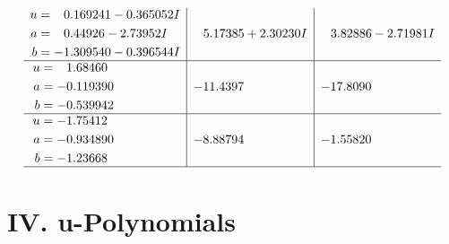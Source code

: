 \documentclass[1p]{elsarticle_modified}
\theoremstyle{definition}
\begin{document}
$$\begin{array}{c|c|c}
\begin{aligned}
u &= \phantom{-}0.169241 - 0.365052 I \\
a &= \phantom{-}0.44926 - 2.73952 I \\
b &= -1.309540 - 0.396544 I\end{aligned}
 & \phantom{-}5.17385 + 2.30230 I & \phantom{-}3.82886 - 2.71981 I \\ \hline\begin{aligned}
u &= \phantom{-}1.68460\phantom{ +0.000000I} \\
a &= -0.119390\phantom{ +0.000000I} \\
b &= -0.539942\phantom{ +0.000000I}\end{aligned}
 & -11.4397\phantom{ +0.000000I} & -17.8090\phantom{ +0.000000I} \\ \hline\begin{aligned}
u &= -1.75412\phantom{ +0.000000I} \\
a &= -0.934890\phantom{ +0.000000I} \\
b &= -1.23668\phantom{ +0.000000I}\end{aligned}
 & -8.88794\phantom{ +0.000000I} & -1.55820\phantom{ +0.000000I}\\
 \hline 
 \end{array}$$\newpage
\newpage\renewcommand{\arraystretch}{1}
\centering \section*{ IV. u-Polynomials}
\end{document}
